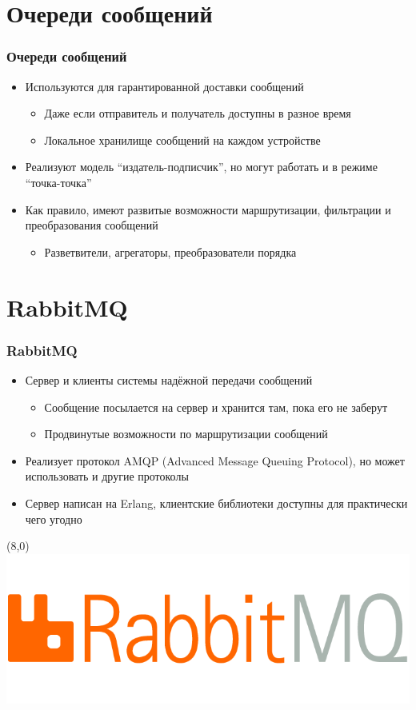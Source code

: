\documentclass[xetex,mathserif,serif]{beamer}
\begin{document}
	\section{Очереди сообщений}

	\begin{frame}
		\frametitle{Очереди сообщений}
		\begin{itemize}
			\item Используются для гарантированной доставки сообщений
			\begin{itemize}
				\item Даже если отправитель и получатель доступны в разное время
				\item Локальное хранилище сообщений на каждом устройстве
			\end{itemize}
			\item Реализуют модель ``издатель-подписчик'', но могут работать и в режиме ``точка-точка''
			\item Как правило, имеют развитые возможности маршрутизации, фильтрации и преобразования сообщений
			\begin{itemize}
				\item Разветвители, агрегаторы, преобразователи порядка
			\end{itemize}
		\end{itemize}
	\end{frame}

	\section{RabbitMQ}

	\begin{frame}
		\frametitle{RabbitMQ}
		\begin{itemize}
			\item Сервер и клиенты системы надёжной передачи сообщений
			\begin{itemize}
				\item Сообщение посылается на сервер и хранится там, пока его не заберут
				\item Продвинутые возможности по маршрутизации сообщений
			\end{itemize}
			\item Реализует протокол AMQP (Advanced Message Queuing Protocol), но может использовать и другие протоколы
			\item Сервер написан на Erlang, клиентские библиотеки доступны для практически чего угодно
		\end{itemize}
		\begin{textblock}{3}(8,0)
			\includegraphics[width=\textwidth]{rabbitmqLogo.png}
		\end{textblock}
	\end{frame}
\end{document}
